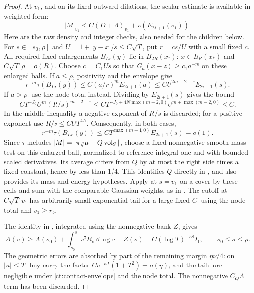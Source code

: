 \begin{proof}
At $v_1$, and on its fixed outward dilations, the scalar estimate is
available in weighted form:
\begin{equation}\label{ct:nearhit-scalar}
 |M|_{v_1}\le C(D+\Lambda)_{v_1}+o(E_{2i+1}(v_1)).
\end{equation}
Here are the raw density and integer checks, also needed for the
children below.  For $s\in[s_0,\rho]$ and
$U=1+|y-x|/s\le C\sqrt T$, put $r=cs/U$ with a small fixed $c$.
All required fixed enlargements $B_{Lr}(y)$ lie in $B_{2R}(x_*)$:
$x\in B_R(x_*)$ and $C\sqrt T\,\rho=o(R)$.  Choose
$a=C_1Us$ so that $G_a(x-z)\ge c_1a^{-m}$ on these enlarged balls.
If $a\le\rho$, positivity and the envelope give
\[
 r^{-m}\tau(B_{Lr}(y))
 \le C(a/r)^m E_{2i+1}(a)
 \le C U^{2m-2-\varepsilon}E_{2i+1}(s).
\]
If $a>\rho$, use the node total instead.  Dividing by
$E_{2i+1}(s)$ gives the bound
\[
 C T^{-J_0}U^m(R/s)^{m-2-\varepsilon}
 \le C T^{-J_0+4N\max(m-2,0)}
             U^{m+\max(m-2,0)}\le C.
\]
In the middle inequality a negative exponent of $R/s$ is discarded;
for a positive exponent use $R/s\le C U T^{4N}$.
Consequently, in both cases,
\begin{equation}\label{ct:cell-density}
 r^{-m}\tau(B_{Lr}(y))
 \le C T^{\max(m-1,0)}E_{2i+1}(s)=o(1).
\end{equation}
Since $\tau$ includes $|M|=|\pi_\#\mu-Q\operatorname{vol}_S|$, choose a fixed
nonnegative smooth mass test on this enlarged ball, normalized to
reference integral one and with bounded scaled derivatives.  Its
average differs from $Q$ by at most the right side times a fixed
constant, hence by less than $1/4$.  This identifies $Q$ directly
in , and also
provides its mass and energy hypotheses.  Apply  at $s=v_1$
on a cover by these cells and sum with the comparable Gaussian
weights, as in .  The cutoff at
$C\sqrt T\,v_1$ has arbitrarily small exponential tail for a large
fixed $C$, using the node total and $v_1\ge r_b$.

The identity in , integrated using the nonnegative
bank $Z$, gives
\begin{equation}\label{ct:nearhit-bank}
 A(s)\ge A(s_0)+\int_{s_0}^s v^2R_v\,\dd\log v+Z(s)
             -C(\log T)^{-58}I_1,
 \qquad s_0\le s\le\rho.
\end{equation}
The geometric errors are absorbed by part of the remaining margin
$\eta\nu/4$: on $|u|\le T$ they carry the factor
$Ce^{-\kappa T}(1+T^2)=o(\eta)$, and the tails are negligible under
\eqref{ct:contact-envelope} and the node total.  The nonnegative
$C_Q\Lambda$ term has been discarded.


\end{proof}
